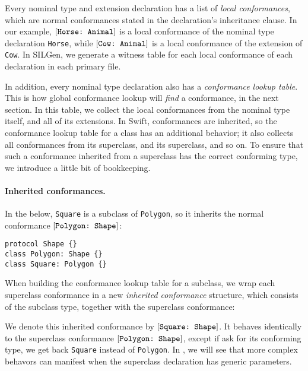 \documentclass[../generics]{subfiles}
\begin{document}
Every nominal type and extension declaration has a list of \emph{local conformances}, which are normal conformances stated in the declaration's inheritance clause. In our example, $[\texttt{Horse:~Animal}]$ is a local conformance of the nominal type declaration \texttt{Horse}, while $[\texttt{Cow:~Animal}]$ is a local conformance of the extension of \texttt{Cow}. In SILGen, we generate a witness table for each local conformance of each declaration in each primary file.

In addition, every nominal type declaration also has a \emph{conformance lookup table}. This is how global conformance lookup will \emph{find} a conformance, in the next section. In this table, we collect the local conformances from the nominal type itself, and all of its extensions. In Swift, conformances are inherited, so the conformance lookup table for a class has an additional behavior; it also collects all conformances from its superclass, and its superclass, and so on. To ensure that such a conformance inherited from a superclass has the correct conforming type, we introduce a little bit of bookkeeping.

\paragraph{Inherited conformances.}
In the below, \texttt{Square} is a subclass of \texttt{Polygon}, so it inherits the normal conformance $[\texttt{Polygon:~Shape}]$:
\begin{Verbatim}
protocol Shape {}
class Polygon: Shape {}
class Square: Polygon {}
\end{Verbatim}
When building the conformance lookup table for a subclass, we wrap each superclass conformance in a new \emph{inherited conformance} structure, which consists of the subclass type, together with the superclass conformance:
\begin{center}
\end{center}
We denote this inherited conformance by $[\texttt{Square:~Shape}]$. It behaves identically to the superclass conformance $[\texttt{Polygon:~Shape}]$, except if ask for its conforming type, we get back \texttt{Square} instead of \texttt{Polygon}. In , we will see that more complex behavors can manifest when the superclass declaration has generic parameters.
\end{document}
